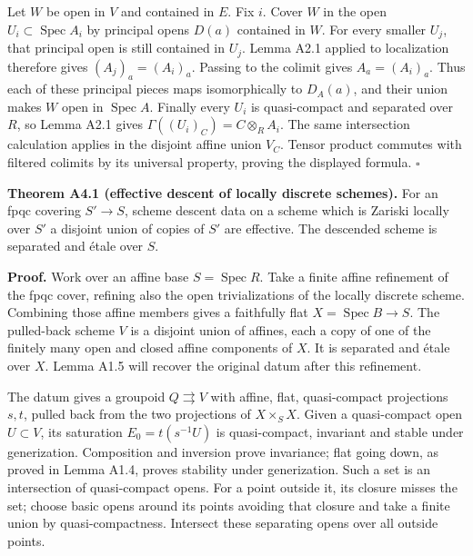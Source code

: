 \documentclass[11pt,a4paper,openany]{report}
\begin{document}
Let \(W\) be open in \(V\) and contained in \(E\). Fix \(i\). Cover \(W\) in the open \(U_i\subset\operatorname{Spec}A_i\) by principal opens \(D(a)\) contained in \(W\). For every smaller \(U_j\), that principal open is still contained in \(U_j\). Lemma A2.1 applied to localization therefore gives \((A_j)_a=(A_i)_a\). Passing to the colimit gives \(A_a=(A_i)_a\). Thus each of these principal pieces maps isomorphically to \(D_A(a)\), and their union makes \(W\) open in \(\operatorname{Spec}A\). Finally every \(U_i\) is quasi-compact and separated over \(R\), so Lemma A2.1 gives \(\Gamma((U_i)_C)=C\otimes_R A_i\). The same intersection calculation applies in the disjoint affine union \(V_C\). Tensor product commutes with filtered colimits by its universal property, proving the displayed formula. \(\square\)

\textbf{Theorem A4.1 (effective descent of locally discrete schemes).} For an fpqc covering \(S'\to S\), scheme descent data on a scheme which is Zariski locally over \(S'\) a disjoint union of copies of \(S'\) are effective. The descended scheme is separated and étale over \(S\).

\textbf{Proof.} Work over an affine base \(S=\operatorname{Spec}R\). Take a finite affine refinement of the fpqc cover, refining also the open trivializations of the locally discrete scheme. Combining those affine members gives a faithfully flat \(X=\operatorname{Spec}B\to S\). The pulled-back scheme \(V\) is a disjoint union of affines, each a copy of one of the finitely many open and closed affine components of \(X\). It is separated and étale over \(X\). Lemma A1.5 will recover the original datum after this refinement.

The datum gives a groupoid \(Q\rightrightarrows V\) with affine, flat, quasi-compact projections \(s,t\), pulled back from the two projections of \(X\times_SX\). Given a quasi-compact open \(U\subset V\), its saturation \(E_0=t(s^{-1}U)\) is quasi-compact, invariant and stable under generization. Composition and inversion prove invariance; flat going down, as proved in Lemma A1.4, proves stability under generization. Such a set is an intersection of quasi-compact opens. For a point outside it, its closure misses the set; choose basic opens around its points avoiding that closure and take a finite union by quasi-compactness. Intersect these separating opens over all outside points.
\end{document}
